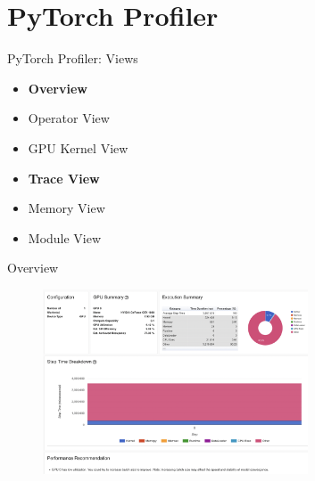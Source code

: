 \documentclass[compress,aspectratio=169]{beamer}
\begin{document}
\section{PyTorch Profiler}
\sectionIntro %

\begin{frame}{PyTorch Profiler: Views}
\begin{itemize}
    \item \textbf{Overview}
    \item Operator View
    \item GPU Kernel View
    \item \textbf{Trace View}
    \item Memory View
    \item Module View
\end{itemize}
\end{frame}

\begin{frame}{Overview}
	\vspace{-1em}
\begin{center}
    \begin{figure}
        \includegraphics[width=0.7\textwidth]{./assets/scap_gtx1080_profiler-torch_14650076}
    \end{figure}
\end{center}

\end{frame}
\end{document}
